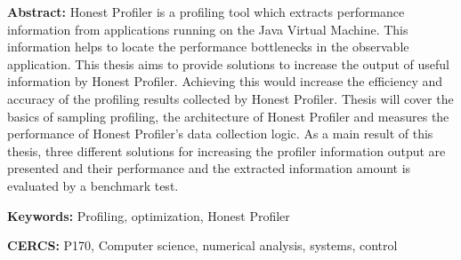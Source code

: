 \documentclass{style/thesis}
\begin{document}
\noindent\textbf{\large \articleName}
\vspace*{3ex}
\begin{flushleft}
  \textbf{Abstract:} 
  Honest Profiler is a profiling tool which extracts performance information from applications running on the Java Virtual Machine. This information helps to locate the performance bottlenecks in the observable application. This thesis aims to provide solutions to increase the output of useful information by Honest Profiler. Achieving this would increase the efficiency and accuracy of the profiling results collected by Honest Profiler. Thesis will cover the basics of sampling profiling, the architecture of Honest Profiler and measures the performance of Honest Profiler's data collection logic. As a main result of this thesis, three different solutions for increasing the profiler information output are presented and their performance and the extracted information amount is evaluated by a benchmark test.
  
  
\end{flushleft}


\vspace*{3ex}
\begin{flushleft}
  \textbf{Keywords:} 
  Profiling, optimization, Honest Profiler
\end{flushleft}
\vspace*{3ex}

\noindent\textbf{CERCS:} 
  P170, Computer science, numerical analysis, systems, control 
\end{document}
